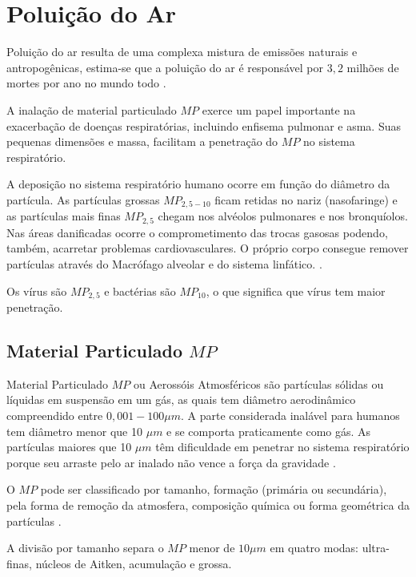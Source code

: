 \section{Poluição do Ar}

Poluição do ar resulta de uma complexa mistura de emissões naturais e 
antropogênicas, estima-se que a poluição do ar é responsável por 
$3,2$ milhões de mortes por ano no mundo todo \citep{lim2013}.

A inalação de material particulado $MP$ exerce um papel importante na 
exacerbação de doenças respiratórias, incluindo enfisema pulmonar e asma. 
Suas pequenas dimensões e massa, facilitam a penetração do $MP$ no sistema 
respiratório. 

A deposição no sistema respiratório humano ocorre em função do diâmetro da partícula.
As partículas grossas $MP_{2,5-10}$ ficam retidas no nariz (nasofaringe) e
as partículas mais finas $MP_{2,5}$ chegam nos alvéolos pulmonares e nos bronquíolos.
Nas áreas danificadas ocorre o comprometimento das trocas gasosas podendo, 
também, acarretar problemas cardiovasculares.
O próprio corpo consegue remover partículas através do Macrófago alveolar 
e do sistema linfático. \citep{arbex2012}.

Os vírus são $MP_{2,5}$ e bactérias são $MP_{10}$, 
o que significa que vírus tem maior penetração.

\subsection{Material Particulado $MP$}

Material Particulado $MP$ ou Aerossóis Atmosféricos são partículas
sólidas ou líquidas em suspensão em um gás, as quais tem diâmetro 
aerodinâmico compreendido  entre $0,001-100\mu m$. 
A parte considerada inalável para humanos tem diâmetro menor que 10 $\mu m$
e se comporta praticamente como gás.
As partículas maiores que 10 $\mu m$ têm dificuldade em penetrar 
no sistema respiratório porque seu arraste pelo ar inalado não vence 
a força da gravidade \citep{seinfeld1998}.

O $MP$ pode ser classificado por tamanho, formação 
(primária ou secundária), pela forma de remoção da atmosfera, 
composição química ou forma geométrica da partículas \citep{seinfeld1998}.

A divisão por tamanho separa o $MP$ menor de $10 \mu m$ em quatro modas:
ultra-finas, núcleos de Aitken, acumulação e grossa. 

